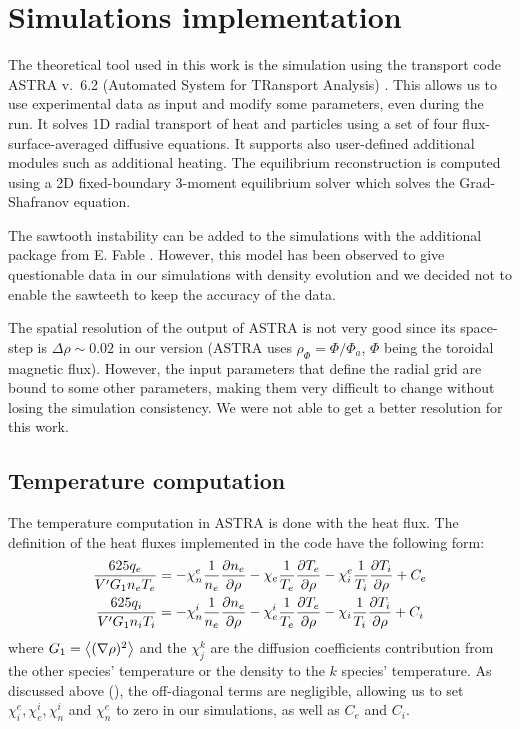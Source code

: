 \chapter{Simulations implementation}\label{sec:sim}\thispagestyle{fancy}
The theoretical tool used in this work is the simulation using the transport code ASTRA v.~6.2 (Automated System for TRansport Analysis) \cite{astra}. This allows us to use experimental data as input and modify some parameters, even during the run. It solves 1D radial transport of heat and particles using a set of four flux-surface-averaged diffusive equations. It supports also user-defined additional modules such as additional heating. The equilibrium reconstruction is computed using a 2D fixed-boundary 3-moment equilibrium solver which solves the Grad-Shafranov equation. 

The sawtooth instability can be added to the simulations with the additional package from E. Fable \cite{fableST}. However, this model has been observed to give questionable data in our simulations with density evolution and we decided not to enable the sawteeth to keep the accuracy of the data.

The spatial resolution of the output of ASTRA is not very good since its space-step is $\Delta \rho \sim 0.02$ in our version (ASTRA uses $\rho_{\Phi} = \Phi / \Phi_a$, $\Phi$ being the toroidal magnetic flux). However, the input parameters that define the radial grid are bound to some other parameters, making them very difficult to change without losing the simulation consistency. We were not able to get a better resolution for this work.
\section{Temperature computation}\label{sec:sim:T}
The temperature computation in ASTRA is done with the heat flux. The definition of the heat fluxes implemented in the code have the following form:
\begin{align*}
	\frac{625 q_e}{V' G_1 n_e T_e} & = - \chi^e_n \frac{1}{n_e} \dfrac{\partial n_e}{\partial \rho} - \chi_e \frac{1}{T_e} \dfrac{\partial T_e}{\partial \rho} - \chi^e_i \frac{1}{T_i} \dfrac{\partial T_i}{\partial \rho} + C_e\\
	\frac{625 q_i}{V' G_1 n_i T_i} & = - \chi^i_n \frac{1}{n_e} \dfrac{\partial n_e}{\partial \rho} - \chi^i_e \frac{1}{T_e} \dfrac{\partial T_e}{\partial \rho} - \chi_i \frac{1}{T_i} \dfrac{\partial T_i}{\partial \rho} + C_i
\end{align*}
where $G_1 = \left\langle (\nabla \rho)^2 \right\rangle$ and the $\chi_j^k$ are the diffusion coefficients contribution from the other species' temperature or the density to the $k$ species' temperature. As discussed above (), the off-diagonal terms are negligible, allowing us to set $\chi^e_i, \chi^i_e, \chi^i_n$ and $\chi^e_n$ to zero in our simulations, as well as $C_e$ and $C_i$.

